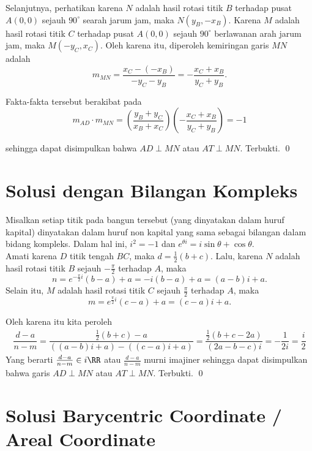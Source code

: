 Selanjutnya, perhatikan karena $N$ adalah hasil rotasi titik $B$ terhadap pusat $A(0,0)$ sejauh $90^\circ$ searah jarum jam, maka $N(y_B,-x_B)$. Karena $M$ adalah hasil rotasi titik $C$ terhadap pusat $A(0,0)$ sejauh $90^\circ$ berlawanan arah jarum jam, maka $M(-y_C,x_C)$. Oleh karena itu, diperoleh kemiringan garis $MN$ adalah 
$$m_{MN}=\dfrac{x_C-(-x_B)}{-y_C-y_B}=-\dfrac{x_C+x_B}{y_C+y_B}.$$

Fakta-fakta tersebut berakibat pada
$$m_{AD} \cdot m_{MN} = \left(\dfrac{y_B+y_C}{x_B+x_C}\right) \left(-\dfrac{x_C+x_B}{y_C+y_B}\right) = -1$$

sehingga dapat disimpulkan bahwa $AD \perp MN$ atau $AT \perp MN$. Terbukti. \qed

\newpage
\section{Solusi dengan Bilangan Kompleks}
Misalkan setiap titik pada bangun tersebut (yang dinyatakan dalam huruf kapital) dinyatakan dalam huruf non kapital yang sama sebagai bilangan dalam bidang kompleks. Dalam hal ini, $i^2=-1$ dan $e^{\theta i} = i \sin \theta + \cos \theta$.\\


Amati karena $D$ titik tengah $BC$, maka $d=\frac{1}{2}(b+c)$. Lalu, karena $N$ adalah hasil rotasi titik $B$ sejauh $-\frac{\pi}{2}$ terhadap $A$, maka $$n=e^{-\frac{\pi}{2}i}(b-a)+a=-i(b-a)+a=(a-b)i+a.$$ Selain itu, $M$ adalah hasil rotasi titik $C$ sejauh $\frac{\pi}{2}$ terhadap $A$, maka $$m=e^{\frac{\pi}{2}i}(c-a)+a=(c-a)i+a.$$


Oleh karena itu kita peroleh
\begin{equation*}
\begin{split}
\dfrac{d-a}{n-m}= \dfrac{\frac{1}{2}(b+c)-a}{((a-b)i+a)-((c-a)i+a)}
= \dfrac{\frac{1}{2}(b+c-2a)}{(2a-b-c)i}
= -\dfrac{1}{2i}=\dfrac{i}{2}
\end{split}
\end{equation*}
Yang berarti $\frac{d-a}{n-m} \in i\RR$ atau  $\frac{d-a}{n-m}$ murni imajiner sehingga dapat disimpulkan bahwa garis $AD \perp MN$ atau $AT \perp MN$. Terbukti. \qed

\newpage
\section{Solusi Barycentric Coordinate / Areal Coordinate}

